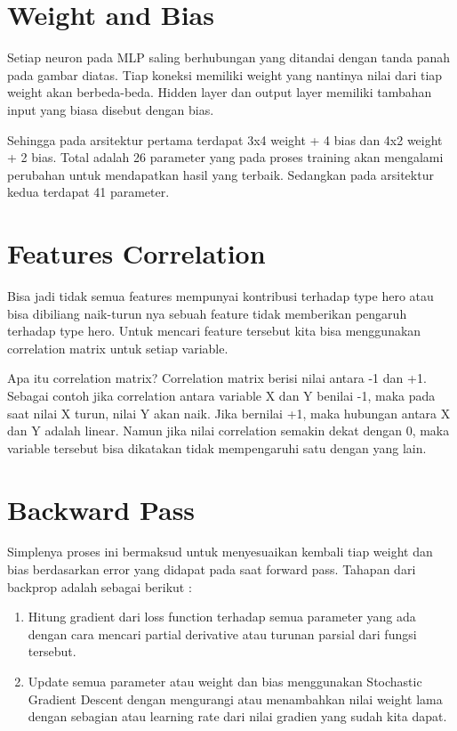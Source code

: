 \section{Weight and Bias}
Setiap neuron pada MLP saling berhubungan yang ditandai dengan tanda panah pada gambar diatas. Tiap koneksi memiliki weight yang nantinya nilai dari tiap weight akan berbeda-beda. Hidden layer dan output layer memiliki tambahan input yang biasa disebut dengan bias.

Sehingga pada arsitektur pertama terdapat 3x4 weight + 4 bias dan 4x2 weight + 2 bias. Total adalah 26 parameter yang pada proses training akan mengalami perubahan untuk mendapatkan hasil yang terbaik. Sedangkan pada arsitektur kedua terdapat 41 parameter.

\section{Features Correlation}
Bisa jadi tidak semua features mempunyai kontribusi terhadap type hero atau bisa dibiliang naik-turun nya sebuah feature tidak memberikan pengaruh terhadap type hero. Untuk mencari feature tersebut kita bisa menggunakan correlation matrix untuk setiap variable.

Apa itu correlation matrix? Correlation matrix berisi nilai antara -1 dan +1. Sebagai contoh jika correlation antara variable X dan Y benilai -1, maka pada saat nilai X turun, nilai Y akan naik. Jika bernilai +1, maka hubungan antara X dan Y adalah linear. Namun jika nilai correlation semakin dekat dengan 0, maka variable tersebut bisa dikatakan tidak mempengaruhi satu dengan yang lain.


\section{Backward Pass} 
Simplenya proses ini bermaksud untuk menyesuaikan kembali tiap weight dan bias berdasarkan error yang didapat pada saat forward pass. Tahapan dari backprop adalah sebagai berikut :

\begin{enumerate}
\item Hitung gradient dari loss function terhadap semua parameter yang ada dengan cara mencari partial derivative atau turunan parsial dari fungsi tersebut.
\item Update semua parameter atau weight dan bias menggunakan Stochastic Gradient Descent  dengan mengurangi atau menambahkan nilai weight lama dengan sebagian atau learning rate dari nilai gradien yang sudah kita dapat.
\end{enumerate}
